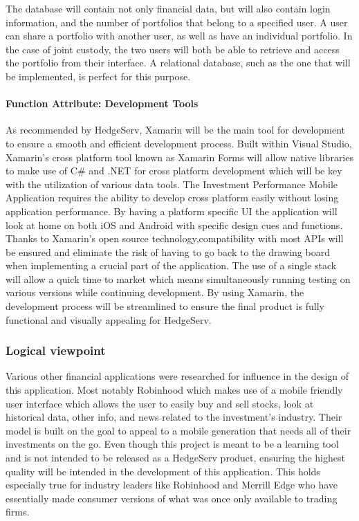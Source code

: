 \documentclass[onecolumn, draftclsnofoot,10pt, compsoc]{IEEEtran}
\begin{document}
        The database will contain not only financial data, but will also contain login information, and the number of portfolios that belong to a specified user. A user can share a portfolio
        with another user, as well as have an individual portfolio. In the case of joint custody, the two users will both be able to retrieve and access the portfolio from their interface.
        A relational database, such as the one that will be implemented, is perfect for this purpose.

\paragraph{Function Attribute: Development Tools}
    As recommended by HedgeServ, Xamarin will be the main tool for development to ensure a smooth and efficient development process. Built within Visual Studio, Xamarin's cross platform tool known as Xamarin Forms will allow native libraries to make use of C\# and .NET for cross platform development which will be key with the utilization of various data tools. The Investment Performance Mobile Application requires the ability to develop cross platform easily without losing application performance. By having a platform specific UI the application will look at home on both iOS and Android with specific design cues and functions. Thanks to Xamarin's open source technology,compatibility with most APIs will be ensured and eliminate the risk of having to go back to the drawing board when implementing a crucial part of the application. The use of a single stack will allow a quick time to market which means simultaneously running testing on various versions while continuing development. By using Xamarin, the development process will be streamlined to ensure the final product is fully functional and visually appealing for HedgeServ. 


\subsubsection{Logical viewpoint}
        Various other financial applications were researched for influence in the design of this application. Most notably Robinhood which makes use of a mobile friendly user interface which allows the user to easily buy and sell stocks, look at historical data, other info, and news related to the investment's industry. Their model is built on the goal to appeal to a mobile generation that needs all of their investments on the go. Even though this project is meant to be a learning tool and is not intended to be released as a HedgeServ product, ensuring the highest quality will be intended in the development of this application. This holds especially true for industry leaders like Robinhood and Merrill Edge who have essentially made consumer versions of what was once only available to trading firms. 
     
\end{document}
